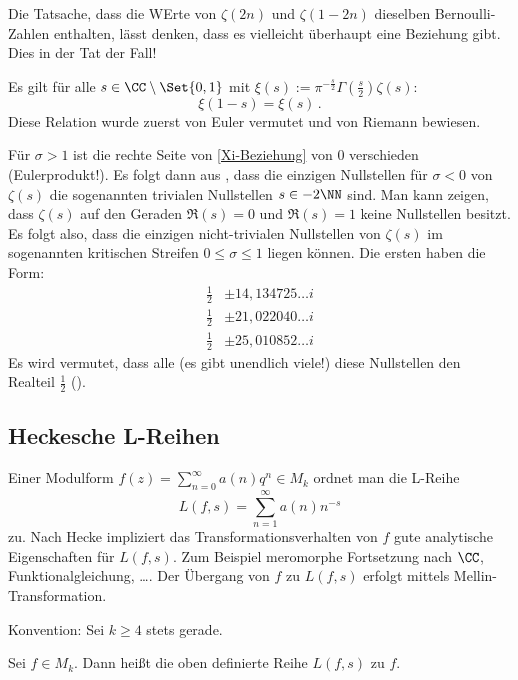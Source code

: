Die Tatsache, dass die WErte von $\zeta(2n)$ und $\zeta(1-2n)$ dieselben Bernoulli-Zahlen enthalten, lässt denken, dass es vielleicht überhaupt eine Beziehung gibt. Dies in der Tat der Fall!

Es gilt für alle $s \in \CC \setminus \Set {0,1}$ mit $\xi(s) := \pi^{- \frac s2} \Gamma( \frac s2 ) \zeta(s)$:
\begin{equation}\label{eq:Xi-Beziehung}
	\xi(1-s) = \xi(s)
	\,.
\end{equation}
Diese Relation wurde zuerst von Euler vermutet und von Riemann bewiesen.

Für $\sigma > 1$ ist die rechte Seite von \eqref{Xi-Beziehung} von $0$ verschieden (Eulerprodukt!). Es folgt dann aus , dass die einzigen Nullstellen für $\sigma < 0$ von $\zeta(s)$ die sogenannten trivialen Nullstellen $s \in -2 \NN$ sind. Man kann zeigen, dass $\zeta(s)$ auf den Geraden $\Re(s) = 0$ und $\Re(s) = 1$ keine Nullstellen besitzt. Es folgt also, dass die einzigen \glqq{}nicht-trivialen\grqq{} Nullstellen von $\zeta(s)$ im sogenannten \glqq{}kritischen Streifen\grqq{} $0 \leq \sigma \leq 1$ liegen können. Die ersten haben die Form:
\begin{align*}
	\frac 12 &\pm 14,134725\ldots i \\
	\frac 12 &\pm 21,022040\ldots i \\
	\frac 12 &\pm 25,010852\ldots i
\end{align*}
Es wird vermutet, dass alle (es gibt unendlich viele!) diese Nullstellen den Realteil $\frac 12$ ().

\subsection{Heckesche L-Reihen}

Einer Modulform $f(z) = \sum_{n=0}^\infty a(n) q^n \in M_k$ ordnet man die L-Reihe
\[
	L(f,s) = \sum_{n=1}^\infty a(n)n^{-s}
\]
zu. Nach Hecke impliziert das Transformationsverhalten von $f$ \glqq{}gute\grqq{} analytische Eigenschaften für $L(f,s)$. Zum Beispiel meromorphe Fortsetzung nach $\CC$, Funktionalgleichung, \ldots. Der Übergang von $f$ zu $L(f,s)$ erfolgt mittels Mellin-Transformation.

Konvention: Sei $k \geq 4$ stets gerade. 

\begin{defi}
Sei $f \in M_k$. Dann heißt die oben definierte Reihe $L(f,s)$  zu $f$. 
\end{defi}

